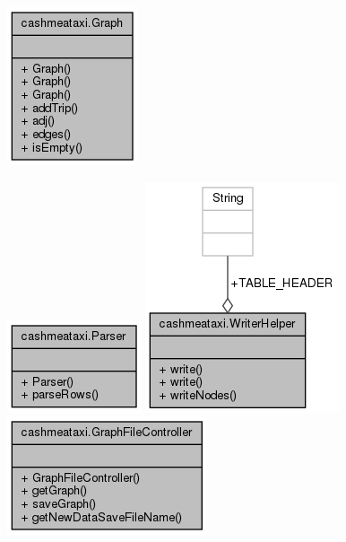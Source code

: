 \documentclass[12pt]{article}
\begin{document}
\begin{center}
\includegraphics[scale = 0.6]{uml/classcashmeataxi_1_1Graph__coll__graph.png} 

\includegraphics[scale = 0.6]{uml/classcashmeataxi_1_1Parser__coll__graph.png}
\includegraphics[scale = 0.6]{uml/classcashmeataxi_1_1WriterHelper__coll__graph.png}
\includegraphics[scale = 0.6]{uml/classcashmeataxi_1_1GraphFileController__coll__graph.png} 


\end{center}
\end{document}

